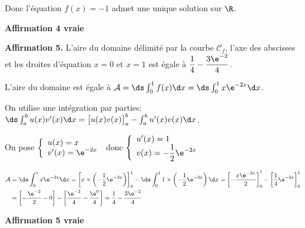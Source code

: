 Donc l'équation $f(x)=-1$ admet une unique solution sur $\R$.

\hfill \textbf{Affirmation 4 vraie}

\bigskip

\textbf{Affirmation 5.} L'aire du domaine délimité par la courbe $\mathcal{C}_{f}$, l'axe des abscisses et les droites d'équation $x=0$ et $x=1$ est égale à $\dfrac{1}{4}-\dfrac{3 \e^{-2}}{4}$.

L'aire du domaine est égale à $\mathcal{A} = \ds\int_{0}^{1}f(x) \d x = \ds \int_{0}^{1} x \e^{-2x} \d x$.

On utilise une intégration par parties:
$\ds\int_{a}^{b} u(x)v'(x)\d x =\left [ u(x)v(x)\strut \right ]_{a}^{b} -\int_{a}^{b} u'(x) v(x) \d x$.

On pose
$\left \{
\begin{array}{l}
u(x)=x\\
v'(x)=\e^{-2x}
\end{array}
\right .$
donc
$\left \{
\begin{array}{l}
u'(x)=1\\
v(x)= -\dfrac{1}{2} \e^{-2x}
\end{array}
\right .$

$\begin{aligned}[t]
\mathcal{A}
& = \ds \int_{0}^{1} x \e^{-2x} \d x
 = \left [x\times \left ( -\dfrac{1}{2}\e^{-2x} \right ) \right ]_{0}^{1}- \ds\int_{0}^{1} 1\times \left ( -\dfrac{1}{2}\e^{-2x} \right ) \d x
 = \left [-\dfrac{x\e^{-2x} }{2} \right ]_{0}^{1}- \left [ \dfrac{1}{4}\e^{-2x} \right ]_{0}^{1}\\
& = \left [ - \dfrac{\e^{-2}}{2} - 0 \right  ] - \left [ \dfrac{\e^{-2}}{4}  - \dfrac{\e^{0}}{4}\right ]
= \dfrac{1}{4} - \dfrac{3\e^{-2}}{4}
\end{aligned}$

\hfill \textbf{Affirmation 5 vraie}

\bigskip
